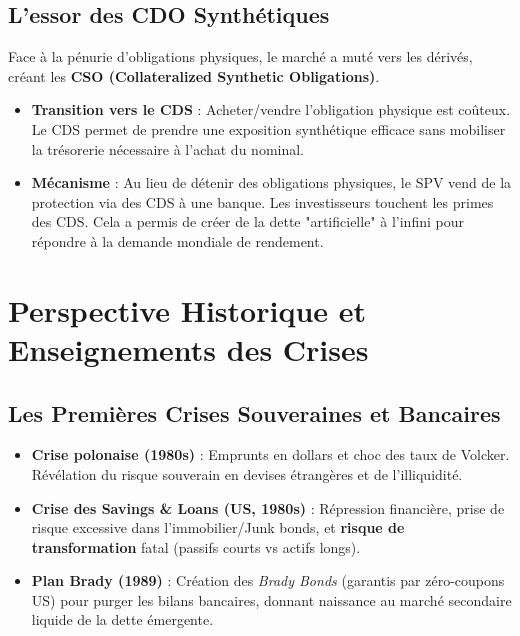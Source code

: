 \subsection{L'essor des CDO Synthétiques}
Face à la pénurie d'obligations physiques, le marché a muté vers les dérivés, créant les \textbf{CSO (Collateralized Synthetic Obligations)}.
\begin{itemize}
    \item \textbf{Transition vers le CDS} : Acheter/vendre l'obligation physique est coûteux. Le CDS permet de prendre une exposition synthétique efficace sans mobiliser la trésorerie nécessaire à l'achat du nominal.
    \item \textbf{Mécanisme} : Au lieu de détenir des obligations physiques, le SPV vend de la protection via des CDS à une banque. Les investisseurs touchent les primes des CDS. Cela a permis de créer de la dette "artificielle" à l'infini pour répondre à la demande mondiale de rendement.
\end{itemize}

\section{Perspective Historique et Enseignements des Crises}

\subsection{Les Premières Crises Souveraines et Bancaires}
\begin{itemize}
    \item \textbf{Crise polonaise (1980s)} : Emprunts en dollars et choc des taux de Volcker. Révélation du risque souverain en devises étrangères et de l'illiquidité.
    \item \textbf{Crise des Savings \& Loans (US, 1980s)} : Répression financière, prise de risque excessive dans l'immobilier/Junk bonds, et \textbf{risque de transformation} fatal (passifs courts vs actifs longs).
    \item \textbf{Plan Brady (1989)} : Création des \textit{Brady Bonds} (garantis par zéro-coupons US) pour purger les bilans bancaires, donnant naissance au marché secondaire liquide de la dette émergente.
\end{itemize}


